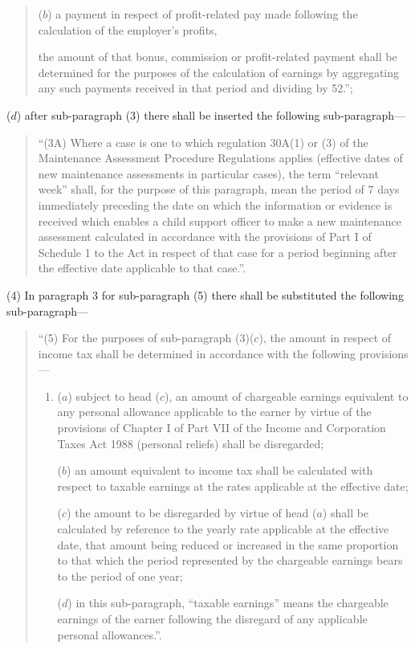 \documentclass[a4paper]{article}
\begin{document}
\begin{enumerate}
\begin{quotation}
\begin{enumerate}
($b$) a payment in respect of profit-related pay made following the calculation of the employer’s profits,
\end{enumerate}
the amount of that bonus, commission or profit-related payment shall be determined for the purposes of the calculation of earnings by aggregating any such payments received in that period and dividing by 52.”;
\end{quotation}

($d$) after sub-paragraph (3) there shall be inserted the following sub-paragraph—
\begin{quotation}
“(3A) Where a case is one to which regulation 30A(1) or (3) of the Maintenance Assessment Procedure Regulations applies (effective dates of new maintenance assessments in particular cases), the term “relevant week” shall, for the purpose of this paragraph, mean the period of 7 days immediately preceding the date on which the information or evidence is received which enables a child support officer to make a new maintenance assessment calculated in accordance with the provisions of Part I of Schedule 1 to the Act in respect of that case for a period beginning after the effective date applicable to that case.”.
\end{quotation}
\end{enumerate}

(4) In paragraph 3 for sub-paragraph (5) there shall be substituted the following sub-paragraph—
\begin{quotation}
“(5) For the purposes of sub-paragraph (3)($c$), the amount in respect of income tax shall be determined in accordance with the following provisions—
\begin{enumerate}\item[]
($a$) subject to head ($c$), an amount of chargeable earnings equivalent to any personal allowance applicable to the earner by virtue of the provisions of Chapter I of Part VII of the Income and Corporation Taxes Act 1988 (personal reliefs) shall be disregarded;

($b$) an amount equivalent to income tax shall be calculated with respect to taxable earnings at the rates applicable at the effective date;

($c$) the amount to be disregarded by virtue of head ($a$) shall be calculated by reference to the yearly rate applicable at the effective date, that amount being reduced or increased in the same proportion to that which the period represented by the chargeable earnings bears to the period of one year;

($d$) in this sub-paragraph, “taxable earnings” means the chargeable earnings of the earner following the disregard of any applicable personal allowances.”.
\end{enumerate}
\end{quotation}
\end{document}
